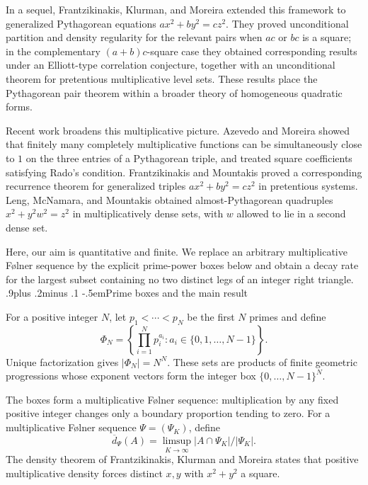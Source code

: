 \documentclass[twoside]{aomart}
\makeatletter
\theoremstyle{paperplain}
\theoremstyle{paperdefinition}
\renewcommand\subsection{\@startsection{subsection}{2}{\z@}
  {.9\baselineskip plus .2\baselineskip minus .1\baselineskip}
  {-.5em}{\normalfont\bfseries}}
\numberwithin{equation}{section}
\makeatother
\begin{document}
In a sequel, Frantzikinakis, Klurman, and Moreira
\cite[Theorems~1.2--1.4 and 1.9--1.10]{FKMgeneralized} extended this
framework to generalized Pythagorean equations
$ax^2+by^2=cz^2$.  They proved unconditional partition and density
regularity for the relevant pairs when $ac$ or $bc$ is a square; in the
complementary $(a+b)c$-square case they obtained corresponding results
under an Elliott-type correlation conjecture, together with an unconditional
theorem for pretentious multiplicative level sets.  These results place the
Pythagorean pair theorem within a broader theory of homogeneous quadratic
forms.

Recent work broadens this multiplicative picture.  Azevedo and Moreira
\cite{AzevedoMoreira} showed that finitely many completely multiplicative
functions can be simultaneously close to $1$ on the three entries of a
Pythagorean triple, and treated square coefficients satisfying Rado's
condition.  Frantzikinakis and Mountakis \cite{FrantzikinakisMountakis} proved a
corresponding recurrence theorem for generalized triples
$ax^2+by^2=cz^2$ in pretentious systems. Leng, McNamara, and Mountakis \cite{LengMcNamaraMountakis}
obtained almost-Pythagorean quadruples $x^2+y^2w^2=z^2$ in
multiplicatively dense sets, with $w$ allowed to lie in a second dense set.

Here, our aim is quantitative and finite.  We replace an arbitrary
multiplicative F\o lner sequence by the explicit prime-power boxes below
and obtain a decay rate for the largest subset containing no two distinct
legs of an integer right triangle.
\subsection{Prime boxes and the main result}

For a positive integer $N$, let $p_1<\cdots<p_N$ be the first $N$
primes and define
\begin{equation*}
 \Phi_N=\left\{\prod_{i=1}^N p_i^{a_i}:
              a_i\in\{0,1,\ldots,N-1\}\right\}.
\end{equation*}
Unique factorization gives $|\Phi_N|=N^N$. These sets are products of finite geometric progressions whose exponent
vectors form the integer box $\{0,\ldots,N-1\}^N$.

The boxes form a multiplicative F\o lner sequence: multiplication by
any fixed positive integer changes only a boundary proportion tending to
zero.  For a multiplicative F\o lner sequence $\Psi=(\Psi_K)$, define
$$\overline d_\Psi(A)=\limsup_{K\to\infty}|A\cap\Psi_K|/|\Psi_K|.$$
The density theorem of Frantzikinakis, Klurman and Moreira \cite[Theorem~1.2(1), with $a=b=c=1$]{FKM} states that
positive multiplicative density forces distinct $x,y$ with
$x^2+y^2$ a square.
\end{document}
